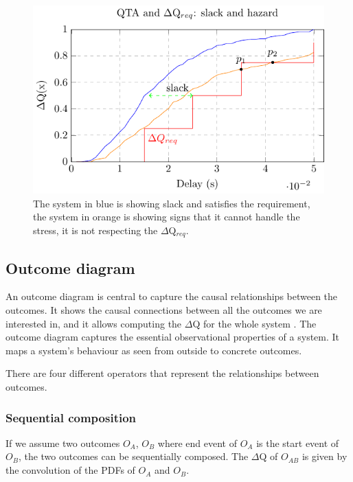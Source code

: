         \begin{figure}[H]
            \begin{center}
                \includegraphics[scale=1]{tikz/cdf_qta_slack.pdf}
            \end{center}
            \caption{The system in blue is showing slack and satisfies the requirement, the system in orange is showing signs that it cannot handle the stress, it is not respecting the $\Delta$Q$_{req}$.}%
        \end{figure}

    \subsection{Outcome diagram}
        An outcome diagram is central to capture the causal relationships between the outcomes. It shows the causal connections between all the outcomes we are interested in, and it allows computing the $\Delta$Q for the whole system \cite{dq-tut}. The outcome diagram captures the essential observational properties of a system. It maps a system's behaviour as seen from outside to concrete outcomes. \cite{art}

        There are four different operators that represent the relationships between outcomes. \cite{dq-tut}

    \subsubsection{Sequential composition}
        If we assume two outcomes $O_A$, $O_B$ where end event of $O_A$ is the start event of $O_B$, the two outcomes can be sequentially composed. The $\Delta$Q of $O_{AB}$ is given by the convolution of the PDFs of $O_A$ and $O_B$.
        
